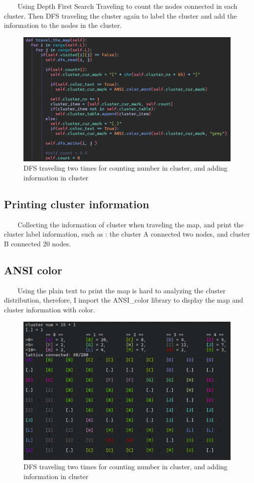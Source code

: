 \documentclass{article}
\begin{document}
~~~~Using Depth First Search Traveling to count the nodes connected in each cluster. Then DFS traveling the cluster again to label the cluster and add the information to the nodes in the cluster.

\begin{figure}[h]
\centering
\includegraphics[width=0.6\linewidth]{DFS traveling.png}
\caption{\label{fig:DFS}DFS traveling two times for counting number in cluster, and adding information in cluster}
\end{figure}

\subsection{Printing cluster information}
~~~~Collecting the information of cluster when traveling the map, and print the cluster label information, such as : the cluster A connected two nodes, and cluster B connected 20 nodes.

\subsection{ANSI color}
~~~~Using the plain text to print the map is hard to analyzing the cluster distribution, therefore, I import the ANSI\_color library to display the map and cluster information with color. 

\newpage

\begin{figure}[h]
\centering
\includegraphics[width=0.45\linewidth]{Percolation result.png}
\caption{\label{fig:DFS}DFS traveling two times for counting number in cluster, and adding information in cluster}
\end{figure}
\end{document}
